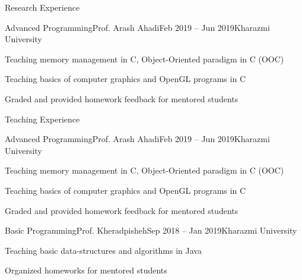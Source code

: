 \documentclass[]{main}
\begin{document}


\begin{section}{Research Experience}
 \begin{subsection}{Advanced Programming}{Prof. Arash Ahadi}{Feb 2019 -- Jun 2019}{Kharazmi University}
     \item Teaching memory management in C, Object-Oriented paradigm in C (OOC) \;\href{https://github.com/ckoliber/ooc_lecture}{\faExternalLink*}
     \item Teaching basics of computer graphics and OpenGL programs in C \;\href{https://github.com/ckoliber/opengl}{\faExternalLink*}
     \item Graded and provided homework feedback for mentored students
 \end{subsection}
\end{section}

\begin{section}{Teaching Experience}
 \begin{subsection}{Advanced Programming}{Prof. Arash Ahadi}{Feb 2019 -- Jun 2019}{Kharazmi University}
     \item Teaching memory management in C, Object-Oriented paradigm in C (OOC) \;\href{https://github.com/ckoliber/ooc_lecture}{\faExternalLink*}
     \item Teaching basics of computer graphics and OpenGL programs in C \;\href{https://github.com/ckoliber/opengl}{\faExternalLink*}
     \item Graded and provided homework feedback for mentored students
 \end{subsection}

 \begin{subsection}{Basic Programming}{Prof. Kheradpisheh}{Sep 2018 -- Jan 2019}{Kharazmi University}
     \item Teaching basic data-structures and algorithms in Java
     \item Organized homeworks for mentored students \;\href{https://github.com/ckoliber/Phy97Sources}{\faExternalLink*}
 \end{subsection}
\end{section}
\end{document}
